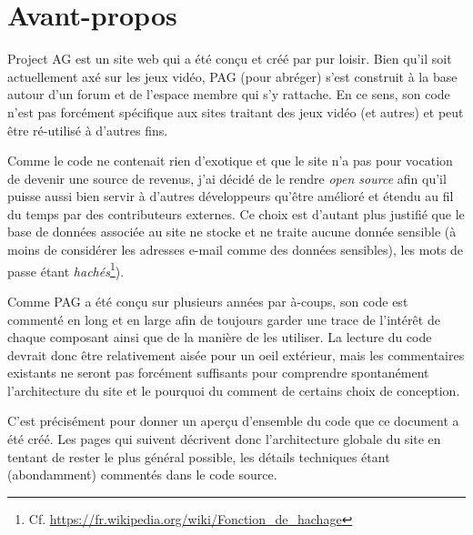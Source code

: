\chapter*{Avant-propos}
\setcounter{chapter}{0}

Project AG est un site web qui a été conçu et créé par pur loisir. Bien qu'il soit actuellement 
axé sur les jeux vidéo, PAG (pour abréger) s'est construit à la base autour d'un forum et de 
l'espace membre qui s'y rattache. En ce sens, son code n'est pas forcément spécifique aux sites 
traitant des jeux vidéo (et autres) et peut être ré-utilisé à d'autres fins.

Comme le code ne contenait rien d'exotique et que le site n'a pas pour vocation de devenir une 
source de revenus, j'ai décidé de le rendre \textit{open source} afin qu'il puisse aussi bien 
servir à d'autres développeurs qu'être amélioré et étendu au fil du temps par des contributeurs 
externes. Ce choix est d'autant plus justifié que le base de données associée au site ne stocke 
et ne traite aucune donnée sensible (à moins de considérer les adresses e-mail comme des données 
sensibles), les mots de passe étant \textit{hachés}\footnote{Cf. 
\url{https://fr.wikipedia.org/wiki/Fonction_de_hachage}}).

Comme PAG a été conçu sur plusieurs années par à-coups, son code est commenté en long et en large 
afin de toujours garder une trace de l'intérêt de chaque composant ainsi que de la manière de 
les utiliser. La lecture du code devrait donc être relativement aisée pour un oeil extérieur, mais 
les commentaires existants ne seront pas forcément suffisants pour comprendre spontanément 
l'architecture du site et le pourquoi du comment de certains choix de conception.

C'est précisément pour donner un aperçu d'ensemble du code que ce document a été créé. Les pages 
qui suivent décrivent donc l'architecture globale du site en tentant de rester le plus général 
possible, les détails techniques étant (abondamment) commentés dans le code source.
